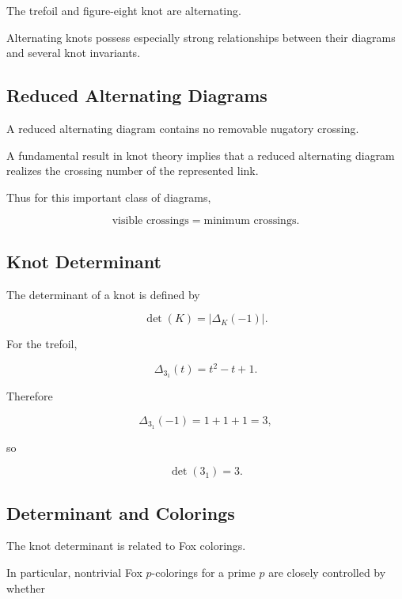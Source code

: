 The trefoil and figure-eight knot are alternating.

Alternating knots possess especially strong relationships between their
diagrams and several knot invariants.

\subsection{Reduced Alternating Diagrams}
\label{subsec:reduced-alternating-diagrams}

A reduced alternating diagram contains no removable nugatory crossing.

A fundamental result in knot theory implies that a reduced alternating
diagram realizes the crossing number of the represented link.

Thus for this important class of diagrams,

\[
\boxed{
\text{visible crossings}
=
\text{minimum crossings}.
}
\]

\subsection{Knot Determinant}
\label{subsec:knot-determinant}

The determinant of a knot is defined by

\[
\boxed{
\det(K)
=
|\Delta_K(-1)|.
}
\]

For the trefoil,

\[
\Delta_{3_1}(t)
=
t^2-t+1.
\]

Therefore

\[
\Delta_{3_1}(-1)
=
1+1+1
=
3,
\]

so

\[
\boxed{
\det(3_1)=3.
}
\]

\subsection{Determinant and Colorings}
\label{subsec:determinant-colorings}

The knot determinant is related to Fox colorings.

In particular, nontrivial Fox \(p\)-colorings for a prime \(p\) are closely
controlled by whether

